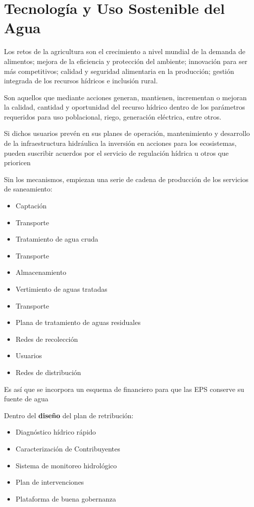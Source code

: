 \chapter{Tecnología y Uso Sostenible del Agua}


Los retos de la agricultura son el crecimiento a nivel mundial de la demanda de alimentos; mejora de la eficiencia y protección del ambiente; innovación para ser más competitivos; calidad y seguridad alimentaria en la producción; gestión integrada de los recursos hídricos e inclusión rural.

\begin{definition}
    Son aquellos que mediante acciones generan, mantienen, incrementan o mejoran la calidad, cantidad y oportunidad del recurso hídrico dentro de los parámetros requeridos para uso poblacional, riego, generación eléctrica, entre otros.
\end{definition}

\begin{example}
    Si dichos usuarios prevén en sus planes de operación, mantenimiento y desarrollo de la infraestructura hidráulica la inversión en acciones para los ecosistemas, pueden suscribir acuerdos por el servicio de regulación hídrica u otros que prioricen
\end{example}

Sin los mecanismos, empiezan una serie de cadena de producción de los servicios de saneamiento:
\begin{itemize}
    \item Captación
    \item Transporte
    \item Tratamiento de agua cruda
    \item Transporte
    \item Almacenamiento
    \item Vertimiento de aguas tratadas
    \item Transporte
    \item Plana de tratamiento de aguas residuales
    \item Redes de recolección
    \item Usuarios
    \item Redes de distribución
\end{itemize}
Es así que se incorpora un esquema de financiero para que las EPS conserve su fuente de agua

Dentro del \textbf{diseño} del plan de retribución:
\begin{itemize}
    \item Diagnóstico hídrico rápido
    \item Caracterización de Contribuyentes
    \item Sistema de monitoreo hidrológico
    \item Plan de intervenciones
    \item Plataforma de buena gobernanza
\end{itemize}

